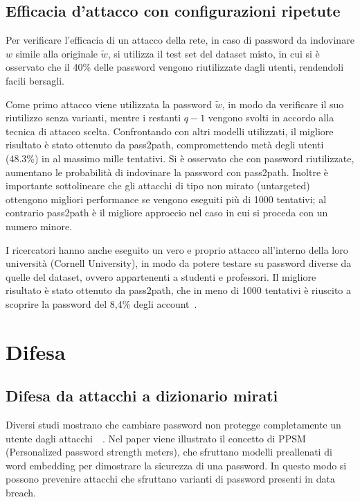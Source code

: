 \subsection{Efficacia d'attacco con configurazioni ripetute}
\label{sec:attacco conf ripetute}
Per verificare l'efficacia di un attacco della rete, in caso di password da indovinare $w$ simile alla originale $\tilde{w}$, si utilizza il test set del dataset misto, in cui si è osservato che il 40\% delle password vengono riutilizzate dagli utenti, rendendoli facili bersagli.

Come primo attacco viene utilizzata la password $\tilde{w}$, in modo da verificare il suo riutilizzo senza varianti, mentre i restanti $q - 1$ vengono svolti in accordo alla tecnica di attacco scelta. Confrontando con altri modelli utilizzati, il migliore risultato è stato ottenuto da pass2path, compromettendo metà degli utenti (48.3\%) in al massimo mille tentativi.
Si è osservato che con password riutilizzate, aumentano le probabilità di indovinare la password con pass2path.
Inoltre è importante sottolineare che gli attacchi di tipo non mirato (untargeted) ottengono migliori performance se vengono eseguiti più di 1000 tentativi; al contrario pass2path è il migliore approccio nel caso in cui si proceda con un numero minore.


I ricercatori hanno anche eseguito un vero e proprio attacco all'interno della loro università (Cornell University), in modo da potere testare su password diverse da quelle del dataset, ovvero appartenenti a studenti e professori. Il migliore risultato è stato ottenuto da pass2path, che in meno di 1000 tentativi è riuscito a scoprire la password del 8,4\% degli account~\cite{bijeeta}.


\section{Difesa}
\label{sec:difesa}
\subsection{Difesa da attacchi a dizionario mirati}
\label{sec:difesa attacchi mirati}
Diversi studi mostrano che cambiare password non protegge completamente un utente dagli attacchi~\cite{google}~\cite{hypr}.
Nel paper viene illustrato il concetto di PPSM (Personalized password strength meters), che sfruttano modelli preallenati di word embedding per dimostrare la sicurezza di una password.
In questo modo si possono prevenire attacchi che sfruttano varianti di password presenti in data breach.

